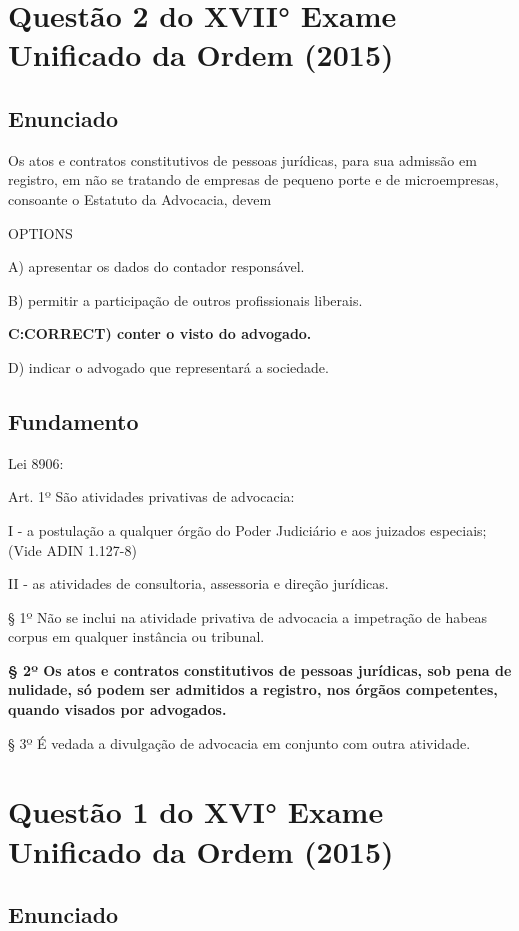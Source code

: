 \documentclass[12pt]{article}
\begin{document}
\section{Questão 2 do XVII° Exame Unificado da Ordem (2015)} 

\subsection{Enunciado} 

Os atos e contratos constitutivos de pessoas jurídicas, para sua 
admissão em registro, em não se tratando de empresas de 
pequeno porte e de microempresas, consoante o Estatuto da 
Advocacia, devem 
 
OPTIONS

A) apresentar os dados do contador responsável. 

B) permitir a participação de outros profissionais liberais. 

\textbf{C:CORRECT) conter o visto do advogado.}

D) indicar o advogado que representará a sociedade.

\subsection{Fundamento}


Lei 8906:

Art. 1º São atividades privativas de advocacia:

I - a postulação a qualquer órgão do Poder Judiciário e aos juizados especiais;        (Vide ADIN 1.127-8)

II - as atividades de consultoria, assessoria e direção jurídicas.

§ 1º Não se inclui na atividade privativa de advocacia a impetração de habeas corpus em qualquer instância ou tribunal.

\textbf{§ 2º Os atos e contratos constitutivos de pessoas jurídicas, sob pena de nulidade, só podem ser admitidos a registro, nos órgãos competentes, quando visados por advogados.}

   § 3º É vedada a divulgação de advocacia em conjunto com outra atividade.


\section{Questão 1 do XVI° Exame Unificado da Ordem (2015)} 

\subsection{Enunciado} 
\end{document}
